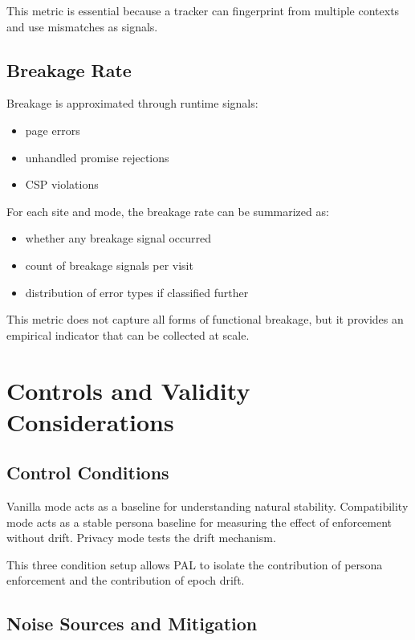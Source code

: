 \documentclass[11pt]{report}
\begin{document}
This metric is essential because a tracker can fingerprint from multiple contexts and use mismatches as signals.

\subsection{Breakage Rate}

Breakage is approximated through runtime signals:

\begin{itemize}
    \item page errors
    \item unhandled promise rejections
    \item CSP violations
\end{itemize}

For each site and mode, the breakage rate can be summarized as:

\begin{itemize}
    \item whether any breakage signal occurred
    \item count of breakage signals per visit
    \item distribution of error types if classified further
\end{itemize}

This metric does not capture all forms of functional breakage, but it provides an empirical indicator that can be collected at scale.

\section{Controls and Validity Considerations}

\subsection{Control Conditions}

Vanilla mode acts as a baseline for understanding natural stability. Compatibility mode acts as a stable persona baseline for measuring the effect of enforcement without drift. Privacy mode tests the drift mechanism.

This three condition setup allows PAL to isolate the contribution of persona enforcement and the contribution of epoch drift.

\subsection{Noise Sources and Mitigation}
\end{document}
